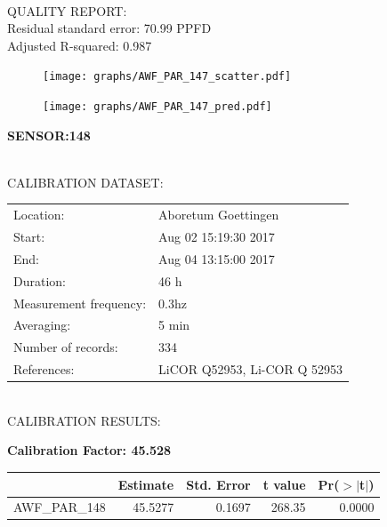 \documentclass[oneside]{report}
\begin{document}
\hrulefill\\
QUALITY REPORT:\\
Residual standard error: 70.99 PPFD\\
Adjusted R-squared: 0.987



\begin{figure}[H]
  \centering
  \texttt{[image: graphs/AWF\_PAR\_147\_scatter.pdf]}
\end{figure}




\begin{figure}[H]
  \centering
  \texttt{[image: graphs/AWF\_PAR\_147\_pred.pdf]}
\end{figure}

\pagebreak


\begin{center}
\large{\textbf{SENSOR:148}}\\
\end{center}

\hrulefill\\
CALIBRATION DATASET:\\
\begin{table}[h!]
  \centering
  \label{tab:table1}
  \begin{tabular}{ll}
    Location: & Aboretum Goettingen\\ 
    
    
    Start:  & Aug 02 15:19:30 2017 \\
    End:   & Aug 04 13:15:00 2017\\ 
    Duration: & 46 h\\
    Measurement frequency: & 0.3hz\\
    Averaging:  &5 min\\
    Number of records: & 334 \\
    References: & LiCOR Q52953, Li-COR Q 52953 \\
  \end{tabular}
\end{table}

\hrulefill\\
CALIBRATION RESULTS:\\


\begin{center}
\textbf{\large{Calibration Factor: 45.528}}\\
\end{center}
\begin{table}[ht]
\centering
\begin{tabular}{rrrrr}
  \hline
 & Estimate & Std. Error & t value & Pr($>$$|$t$|$) \\ 
  \hline
AWF\_PAR\_148 & 45.5277 & 0.1697 & 268.35 & 0.0000 \\ 
   \hline
\end{tabular}
\end{table}
\end{document}
